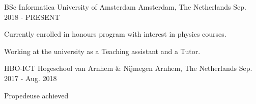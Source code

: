 


\begin{cventries}


\cventry
{BSc Informatica} %
{University of Amsterdam} %
{Amsterdam, The Netherlands} %
{Sep. 2018 - PRESENT} %
{ %
\begin{cvitems}
\item {Currently enrolled in honours program with interest in physics courses. }
\item {Working at the university as a Teaching assistant and a Tutor.}
\end{cvitems}
}


\cventry
{HBO-ICT} %
{Hogeschool van Arnhem \& Nijmegen} %
{Arnhem, The Netherlands} %
{Sep. 2017 - Aug. 2018} %
{ %
\begin{cvitems}
\item {Propedeuse achieved}
\end{cvitems}
}


\end{cventries}
